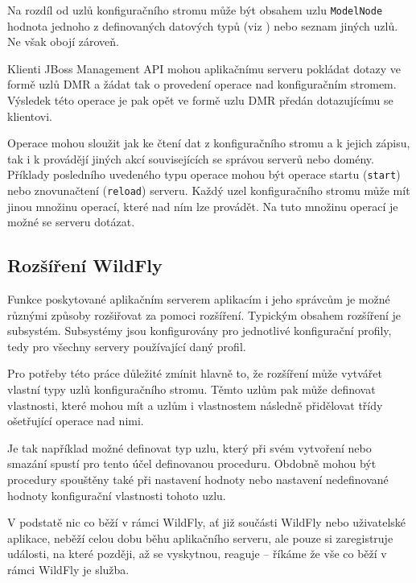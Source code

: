 Na rozdíl od uzlů konfiguračního stromu může být obsahem uzlu {\tt ModelNode} hodnota jednoho z definovaných datových typů (viz \cite{jboss7slideShare}) nebo seznam jiných uzlů. Ne však obojí zároveň.
\cite{jboss7slideShare}

Klienti JBoss Management API mohou aplikačnímu serveru pokládat dotazy ve formě uzlů DMR a žádat tak o provedení operace nad konfiguračním stromem.
Výsledek této operace je pak opět ve formě uzlu DMR předán dotazujícímu se klientovi.
\cite{jbossDetypedManagement}

Operace mohou sloužit jak ke čtení dat z konfiguračního stromu a k jejich zápisu, tak i k provádějí jiných akcí souvisejících se správou serverů nebo domény.
Příklady posledního uvedeného typu operace mohou být operace startu ({\tt start}) nebo znovunačtení ({\tt reload}) serveru.
Každý uzel konfiguračního stromu může mít jinou množinu operací, které nad ním lze provádět.
Na tuto množinu operací je možné se serveru dotázat.
\cite{jbossDetypedManagement}

\subsection{Rozšíření WildFly} \label{rozsireniWildFly}

Funkce poskytované aplikačním serverem aplikacím i jeho správcům je možné různými způsoby rozšiřovat za pomoci rozšíření.
Typickým obsahem rozšíření je subsystém. Subsystémy jsou konfigurovány pro jednotlivé konfigurační profily, tedy pro všechny servery používající daný profil.

Pro potřeby této práce důležité zmínit hlavně to, že rozšíření může vytvářet vlastní typy uzlů konfiguračního stromu.
Těmto uzlům pak může definovat vlastnosti, které mohou mít a uzlům i vlastnostem následně přidělovat třídy ošetřující operace nad nimi.
\cite{WildFlyExtending}

Je tak například možné definovat typ uzlu, který při svém vytvoření nebo smazání spustí pro tento účel definovanou proceduru.
Obdobně mohou být procedury spouštěny také při nastavení hodnoty nebo nastavení nedefinované hodnoty konfigurační vlastnosti tohoto uzlu.

V podstatě nic co běží v rámci WildFly, ať již součásti WildFly nebo uživatelské aplikace, neběží celou dobu běhu aplikačního serveru, ale pouze si zaregistruje události, na které později, až se vyskytnou, reaguje -- říkáme že vše co běží v rámci WildFly je služba. \cite{jboss7slideShare}

